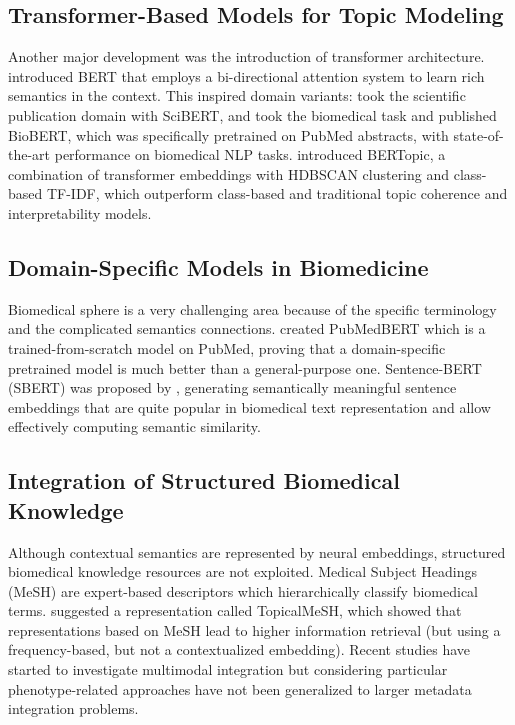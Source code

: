 \documentclass[utf8]{FrontiersinHarvard}
\begin{document}
\subsection{Transformer-Based Models for Topic Modeling}

Another major development was the introduction of transformer architecture. \citet{devlin_bert_2019} introduced BERT that employs a bi-directional attention system to learn rich semantics in the context. This inspired domain variants: \citet{beltagy_scibert_2019} took the scientific publication domain with SciBERT, and \citet{lee_biobert_2020} took the biomedical task and published BioBERT, which was specifically pretrained on PubMed abstracts, with state-of-the-art performance on biomedical NLP tasks. \citet{grootendorst_bertopic_2022} introduced BERTopic, a combination of transformer embeddings with HDBSCAN clustering and class-based TF-IDF, which outperform class-based and traditional topic coherence and interpretability models.

\subsection{Domain-Specific Models in Biomedicine}

Biomedical sphere is a very challenging area because of the specific terminology and the complicated semantics connections. \citet{gu_domain_2022} created PubMedBERT which is a trained-from-scratch model on PubMed, proving that a domain-specific pretrained model is much better than a general-purpose one. Sentence-BERT (SBERT) was proposed by \citet{reimers_sentence-bert_2019}, generating semantically meaningful sentence embeddings that are quite popular in biomedical text representation and allow effectively computing semantic similarity.

\subsection{Integration of Structured Biomedical Knowledge}

Although contextual semantics are represented by neural embeddings, structured biomedical knowledge resources are not exploited. Medical Subject Headings (MeSH) are expert-based descriptors which hierarchically classify biomedical terms. \citet{yu_improving_2016} suggested a representation called TopicalMeSH, which showed that representations based on MeSH lead to higher information retrieval (but using a frequency-based, but not a contextualized embedding). Recent studies have started to investigate multimodal integration but considering particular phenotype-related approaches have not been generalized to larger metadata integration problems.
\end{document}
